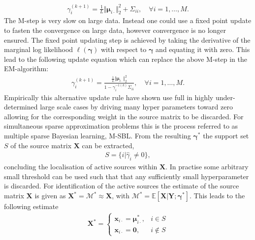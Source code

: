 \begin{align*}
\gamma_i^{(k+1)} = \frac{1}{L} \Vert \boldsymbol{\mu}_{i \cdot} \Vert_2^2 + \Sigma_{ii}, \quad \forall i = 1, \dots, M.
\end{align*}
The M-step is very slow on large data. 
Instead one could use a fixed point update to fasten the convergence on large data, however convergence is no longer ensured. 
The fixed point updating step is achieved by taking the derivative of the marginal log likelihood $\ell(\boldsymbol{\gamma})$ with respect to $\boldsymbol{\gamma}$ and equating it with zero. 
This lead to the following update equation which can replace the above M-step in the EM-algorithm:
\begin{align*}
\gamma_i^{(k+1)} = \frac{\frac{1}{L} \Vert \boldsymbol{\mu}_{i \cdot} \Vert_2^2}{1 - \gamma_i^{-1 (k)} \Sigma_{ii}}, \quad \forall i = 1, \dots, M.
\end{align*}
Empirically this alternative update rule have shown use full in highly under-determined large scale cases by driving many hyper parameters toward zero allowing for the corresponding weight in the source matrix to be discarded. 
For simultaneous sparse approximation problems this is the process referred to as multiple sparse Bayesian learning, M-SBL.
From the resulting $\boldsymbol{\gamma}^\ast$ the support set $S$ of the source matrix $\textbf{X}$ can be extracted, 
\begin{align*}
S = \{ i \vert \hat{\gamma}_i \neq 0 \},
\end{align*}
concluding the localisation of active sources within $\textbf{X}$. 
In practise some arbitrary small threshold can be used such that that any sufficiently small hyperparameter is discarded.
For identification of the active sources the estimate of the source matrix $\textbf{X}$ is given as $\textbf{X}^\ast=\mathcal{M}^\ast \approx \textbf{X}$, with $\mathcal{M}^\ast = \mathbb{E}[\textbf{X}\vert \textbf{Y};\boldsymbol{\gamma}^\ast]$. 
This leads to the following estimate  
\begin{align*}
\mathbf{X}^\ast = 
\begin{cases}
\mathbf{x}_{i\cdot} = \boldsymbol{\mu}_{i \cdot}^\ast, & i \in S \\
\mathbf{x}_{i\cdot} = \mathbf{0}, & i \not \in S
\end{cases}
\end{align*}

